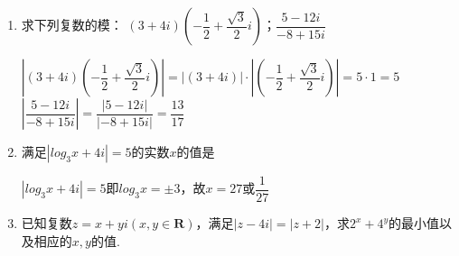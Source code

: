 \begin{enumerate}
\begin{enumerate}
    \begin{jieda}
    \end{jieda}
    \item 求下列复数的模： $(3+4i)\left(-\dfrac{1}{2} + \dfrac{\sqrt{3}}{2}i\right)$；$\dfrac{5-12i}{-8+15i}$
    \begin{jieda}
        $\left|(3+4i)\left(-\dfrac{1}{2} + \dfrac{\sqrt{3}}{2}i\right)\right| = |(3+4i)|\cdot\left|\left(-\dfrac{1}{2} + \dfrac{\sqrt{3}}{2}i\right)\right| = 5 \cdot 1 = 5$ \\
        $\left |\dfrac{5-12i}{-8+15i} \right | = \dfrac{|5-12i|}{|-8+15i|} = \dfrac{13}{17}$
    \end{jieda}
    \item 满足$|log_3x + 4i| = 5$的实数$x$的值是
    \begin{jieda}
        $|log_3x + 4i| = 5$即$log_3x = \pm 3$，故$x = 27$或$\dfrac{1}{27}$
    \end{jieda}
    \item 已知复数$z = x + yi (x, y \in \mathbf{R})$，满足$|z - 4i| = |z+2|$，求$2^x + 4^y$的最小值以及相应的$x, y$的值.

\end{enumerate}
\end{enumerate}
